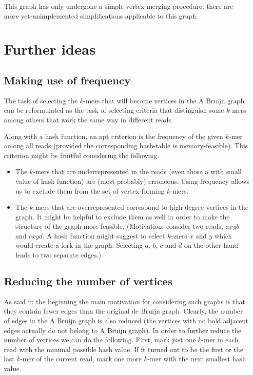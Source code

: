 \documentclass[12pt]{article}
\begin{document}
This graph has only undergone a simple vertex-merging procedure; there are more
yet-unimplemented simplifications applicable to this graph.

\section{Further ideas}

\subsection{Making use of frequency}

The task of selecting the $k$-mers that will become vertices in the A Bruijn graph can be reformulated
as the task of selecting criteria that distinguish some $k$-mers among others that work the same way
in different reads.

Along with a hash function, an apt criterion is the frequency of the given $k$-mer among all reads
(provided the corresponding hash-table is memory-feasible). This criterion might be fruitful considering
the following.

\begin{itemize}
  \item The $k$-mers that are underrepresented{} in the 
  reads (even those a with small value of hash function)
  are (most probably) erroneous. Using frequency allows us 
  to exclude them from the set of
  vertex-forming $k$-mers.
  \item The $k$-mers that are overrepresented correspond to high-degree vertices in the graph.
  It might be helpful to exclude them as well in order to make the structure of the graph more feasible.
  (Motivation: consider two reads, $axyb$ and $cxyd$. A hash function might suggest to select $k$-mers $x$ and
  $y$ which would create a fork in the graph. Selecting $a$, $b$, $c$ and $d$ on the other hand leads to
  two separate edges.)
\end{itemize}

\subsection{Reducing the number of vertices}
As said in the beginning the main motivation for considering such graphs
is that they contain fewer edges than the original de Bruijn graph. Clearly, the number of edges in the
A Bruijn graph is also reduced (the vertices with no bold adjacent edges actually do not belong
to A Bruijn graph). In order to further reduce the number of vertices we can do the following.
First, mark just one $k$-mer in each read with the minimal possible hash value. If it turned out to be
the first or the last $k$-mer of the current read, mark one more $k$-mer with the next smallest hash 
value.
\end{document}
